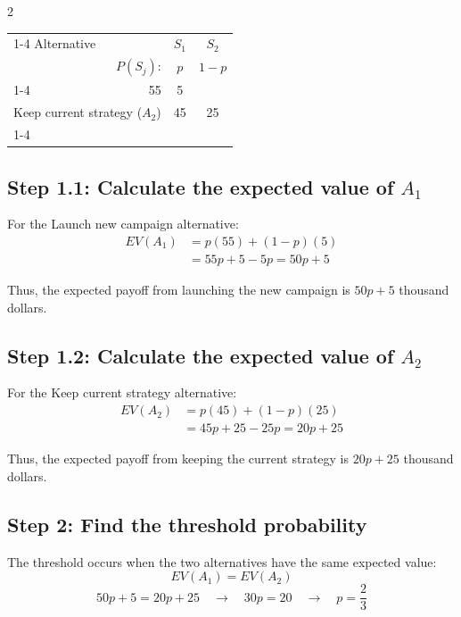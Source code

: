 \begin{multicols}{2}
	\vspace{-3mm}
	\begin{center}
		\renewcommand{\arraystretch}{1.3}
		\small
		\begin{tabular}{lr@{\qquad}cc}
			\cmidrule{1-4}
			Alternative & & $S_1$ & $S_2$ \\
			& $P(S_j)$: & $p$ & $1-p$ \\
			\cmidrule{1-4}
			\multicolumn{2}{l}{Launch new campaign ($A_1$)} & 55 & 5 \\
			\multicolumn{2}{l}{Keep current strategy ($A_2$)} & 45 & 25 \\
			\cmidrule{1-4}
		\end{tabular}
	\end{center}
	
	\vspace{-4mm}
	
	\subsection*{Step 1.1: Calculate the expected value of $A_1$}
	
	For the Launch new campaign alternative:
	\[
	\begin{aligned}
		EV(A_1)
		&=p(55)+(1-p)(5)\\
		&=55p+5-5p = 50p+5
	\end{aligned}
	\]
	
	Thus, the expected payoff from launching the new campaign is
	$50p+5$ thousand dollars.
	
	\subsection*{Step 1.2: Calculate the expected value of $A_2$}
	
	For the Keep current strategy alternative:
	\[
	\begin{aligned}
		EV(A_2)
		&=p(45)+(1-p)(25)\\
		&=45p+25-25p = 20p+25
	\end{aligned}
	\]
	
	Thus, the expected payoff from keeping the current strategy is
	$20p+25$ thousand dollars.
	
	\subsection*{Step 2: Find the threshold probability}
	
	The threshold occurs when the two alternatives have the same expected
	value:
	\[
	EV(A_1)=EV(A_2)
	\]
	\[
	50p+5=20p+25
	\quad\longrightarrow\quad
	30p=20
	\quad\longrightarrow\quad
	p=\frac{2}{3}
	\]
	

\end{multicols}
